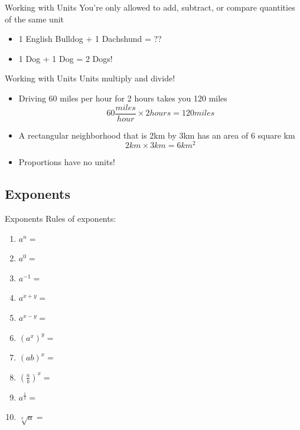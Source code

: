 \documentclass[]{beamer}
\begin{document}
    \begin{frame}{Working with Units}
        You're only allowed to add, subtract, or compare quantities of the same unit
        \begin{itemize}
            \item<2-> 1 English Bulldog + 1 Dachshund = ??
            \item<3-> 1 Dog + 1 Dog = 2 Dogs!            
        \end{itemize}
    \end{frame}

    \begin{frame}{Working with Units}
        Units multiply and divide! 
        \begin{itemize}
            \item<2-> Driving 60 miles per hour for 2 hours takes you 120 miles $$60 \frac{miles}{hour} \times 2 hours = 120 miles $$
            \item<3-> A rectangular neighborhood that is 2km by 3km has an area of 6 square km $$2 km \times 3km = 6km^2$$
            \item<4-> Proportions have no units!
        \end{itemize}
    \end{frame}

\subsection{Exponents}

    \begin{frame}{Exponents}
        Rules of exponents:
        \begin{enumerate}
            \item<2-> $a^n = $ 
            \item<4-> $a^0 = $  
            \item<6-> $a^{-1} = $ 
            \item<8-> $a^{x+y} = $ 
            \item<10-> $a^{x-y} = $ 
            \item<12-> $(a^x)^y = $ 
            \item<14-> $(ab)^x = $ 
            \item<16-> $(\frac{a}{b})^x = $ 
            \item<18-> $a^{\frac{1}{2}} = $ 
            \item<20-> $\sqrt[x]{a} = $ 
        \end{enumerate}
    \end{frame}
\end{document}

